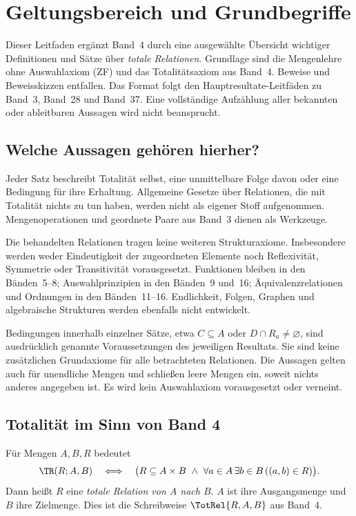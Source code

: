 \chapter{Geltungsbereich und Grundbegriffe}

Dieser Leitfaden ergänzt Band~4 durch eine ausgewählte Übersicht
wichtiger Definitionen und Sätze über \emph{totale Relationen}.
Grundlage sind die Mengenlehre ohne Auswahlaxiom (ZF) und das
Totalitätsaxiom aus Band~4. Beweise und Beweisskizzen entfallen.
Das Format folgt den Hauptresultate-Leitfäden zu Band~3,
Band~28 und Band~37. Eine vollständige Aufzählung aller bekannten
oder ableitbaren Aussagen wird nicht beansprucht.

\section{Welche Aussagen gehören hierher?}

Jeder Satz beschreibt Totalität selbst, eine unmittelbare Folge
davon oder eine Bedingung für ihre Erhaltung. Allgemeine Gesetze
über Relationen, die mit Totalität nichts zu tun haben, werden
nicht als eigener Stoff aufgenommen. Mengenoperationen und
geordnete Paare aus Band~3 dienen als Werkzeuge.

Die behandelten Relationen tragen keine weiteren Strukturaxiome.
Insbesondere werden weder Eindeutigkeit der zugeordneten Elemente
noch Reflexivität, Symmetrie oder Transitivität vorausgesetzt.
Funktionen bleiben in den Bänden~5--8; Auswahlprinzipien in den
Bänden~9 und~16; Äquivalenzrelationen und Ordnungen in den
Bänden~11--16. Endlichkeit, Folgen, Graphen und algebraische
Strukturen werden ebenfalls nicht entwickelt.

Bedingungen innerhalb einzelner Sätze, etwa $C\subseteq A$ oder
$D\cap R_a\ne\varnothing$, sind ausdrücklich genannte
Voraussetzungen des jeweiligen Resultats. Sie sind keine
zusätzlichen Grundaxiome für alle betrachteten Relationen.
Die Aussagen gelten auch für unendliche Mengen und schließen
leere Mengen ein, soweit nichts anderes angegeben ist.
Es wird kein Auswahlaxiom vorausgesetzt oder verneint.

\section{Totalität im Sinn von Band 4}

\begin{definition}\label{b04guide:def:total}
Für Mengen $A,B,R$ bedeutet
\[
 \TR(R;A,B)\quad\Longleftrightarrow\quad
 \bigl(R\subseteq A\times B\ \land\
       \forall a\in A\,\exists b\in B\,((a,b)\in R)\bigr).
\]
Dann heißt $R$ eine \emph{totale Relation von $A$ nach $B$}.
$A$ ist ihre Ausgangsmenge und $B$ ihre Zielmenge.
Dies ist die Schreibweise $\TotRel{R,A,B}$ aus Band~4.
\end{definition}

